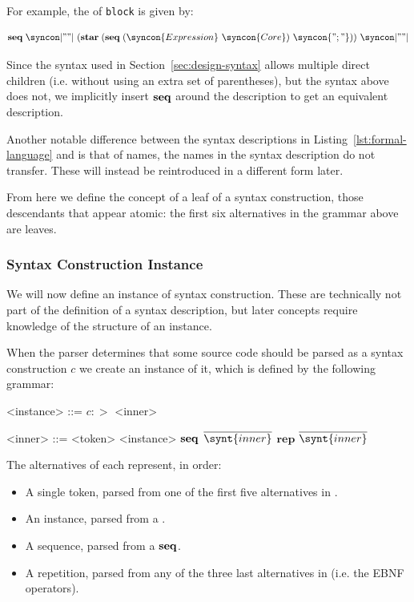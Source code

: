 \documentclass{kththesis}
\begin{document}
For example, the  of \texttt{block} is given by:

$$
\seq \syncon|"{"|\ (\repstar (\seq (\syncon{Expression}\ \syncon{Core})\ \syncon{";"}))\ \syncon|"}"|
$$

Since the syntax used in Section~\ref{sec:design-syntax} allows multiple direct children (i.e. without using an extra set of parentheses), but the syntax above does not, we implicitly insert $\mathrel{\mathbf{seq}}$ around the description to get an equivalent description.

Another notable difference between the syntax descriptions in Listing~\ref{lst:formal-language} and  is that of names, the names in the syntax description do not transfer. These will instead be reintroduced in a different form later.

From here we define the concept of a leaf of a syntax construction, those descendants that appear atomic: the first six alternatives in the grammar above are leaves.

\subsubsection{Syntax Construction Instance} \label{sec:defining-instances}

We will now define an instance of syntax construction. These are technically not part of the definition of a syntax description, but later concepts require knowledge of the structure of an instance.

When the parser determines that some source code should be parsed as a syntax construction $c$ we create an instance of it, which is defined by the following grammar:

\newcommand{\repseq}{\mathrel{\mathbf{rep}}}

\setlength{\grammarindent}{6.5em}
\begin{grammar}
<instance> ::= $c :>$ <inner>

<inner> ::= <token>
  \alt <instance>
  \alt $\mathrel{\mathbf{seq}}$ $\overline{\synt{inner}}$
  \alt $\repseq$ $\overline{\synt{inner}}$
\end{grammar}

The alternatives of  each represent, in order:
\begin{itemize}
  \item A single token, parsed from one of the first five alternatives in .
  \item An instance, parsed from a .
  \item A sequence, parsed from a $\mathrel{\mathbf{seq}}$.
  \item A repetition, parsed from any of the three last alternatives in  (i.e. the EBNF operators).
\end{itemize}
\end{document}
